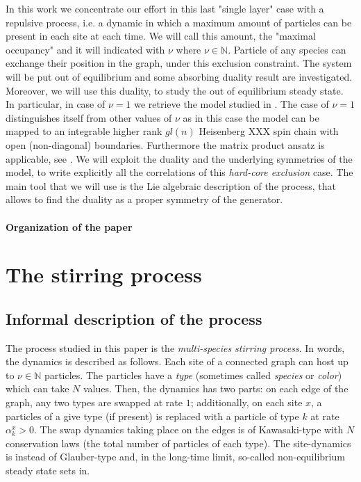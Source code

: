 \documentclass[10pt]{article}
\numberwithin{equation}{section}
\numberwithin{equation}{subsection}
\newcommand{\twoj}{\nu}
\begin{document}
In this work we concentrate our effort in this last "single layer" case with a repulsive process, i.e. a dynamic in which a maximum amount of particles can be present in each site at each time. We will call this amount, the "maximal occupancy" and it will indicated with $\twoj$ where $\twoj\in\mathbb{N}$. Particle of any species can exchange their position in the graph, under this exclusion constraint. The system will be put out of equilibrium and some absorbing duality result are investigated. Moreover, we will use this duality, to study the out of equilibrium steady state. In particular, in case of $\twoj=1$ we retrieve the model studied in \cite{vanicat2017exact}. 
{\color{red}
The case of $\twoj=1$ distinguishes itself from other values of $\twoj$ as in this case the model can be mapped to an integrable higher rank $gl(n)$ Heisenberg XXX spin chain with open (non-diagonal) boundaries. Furthermore the matrix product ansatz \cite{derrida1993exact}  is applicable, see \cite{Crampe:2014aoa,vanicat2017exact}.
}
We will exploit the duality and the underlying symmetries of the model, to write explicitly all the correlations of this \textit{hard-core exclusion} case. The main tool that we will use is the Lie algebraic description of the process, that allows to find the duality as a proper symmetry of the generator. 
\paragraph{Organization of the paper}
\section{The stirring process}
\subsection{Informal description of the process}
The process studied in this paper is the {\em multi-species stirring process}. 
In words, the dynamics is described as follows. Each site
of a connected graph can host up to $\nu\in \mathbb{N}$ particles.
The particles have a {\em type} (sometimes called {\em species} or {\em color})
which can take $N$ values.
Then, the dynamics has two parts: on each edge of the graph, 
any two types are swapped at rate $1$; additionally, on each site $x$, 
a particles of a give type (if present) is replaced with a
particle of type $k$ at rate $\alpha_k^x >0$.
The swap dynamics taking place on the edges is of Kawasaki-type 
with $N$ conservation laws
(the total number of particles of each type). 
The site-dynamics is instead of Glauber-type 
and, in the long-time limit, so-called non-equilibrium
steady state sets in.
\end{document}
